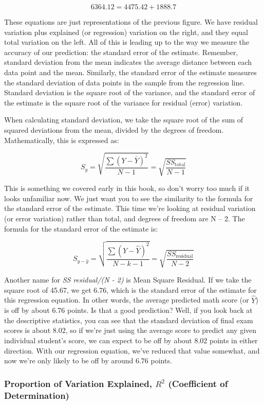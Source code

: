 \documentclass[
  letterpaper,
  DIV=11,
  numbers=noendperiod]{scrreprt}
\begin{document}
\[
6364.12 = 4475.42 + 1888.7
\]

These equations are just representations of the previous figure. We have
residual variation plus explained (or regression) variation on the
right, and they equal total variation on the left. All of this is
leading up to the way we measure the accuracy of our prediction: the
standard error of the estimate. Remember, standard deviation from the
mean indicates the average distance between each data point and the
mean. Similarly, the standard error of the estimate measures the
standard deviation of data points in the sample from the regression
line. Standard deviation is the square root of the variance, and the
standard error of the estimate is the square root of the variance for
residual (error) variation.

When calculating standard deviation, we take the square root of the sum
of squared deviations from the mean, divided by the degrees of freedom.
Mathematically, this is expressed as:

\[
S_y = \sqrt{\frac{\sum (Y - \bar{Y})^2}{N - 1}} = \sqrt{\frac{SS_{\text{total}}}{N - 1}}
\]

This is something we covered early in this book, so don't worry too much
if it looks unfamiliar now. We just want you to see the similarity to
the formula for the standard error of the estimate. This time we're
looking at residual variation (or error variation) rather than total,
and degrees of freedom are N -- 2. The formula for the standard error of
the estimate is:

\[
S_{y - \hat{y}} = \sqrt{\frac{\sum (Y - \hat{Y})^2}{N - k - 1}} = \sqrt{\frac{SS_{\text{residual}}}{N - 2}}
\]

Another name for \emph{SS residual/(N - 2)} is Mean Square Residual. If
we take the square root of 45.67, we get 6.76, which is the standard
error of the estimate for this regression equation. In other words, the
average predicted math score (or \(\hat{Y}\)) is off by about 6.76
points. Is that a good prediction? Well, if you look back at the
descriptive statistics, you can see that the standard deviation of final
exam scores is about 8.02, so if we're just using the average score to
predict any given individual student's score, we can expect to be off by
about 8.02 points in either direction. With our regression equation,
we've reduced that value somewhat, and now we're only likely to be off
by around 6.76 points.

\subsubsection*{\texorpdfstring{Proportion of Variation Explained,
\(R^2\) (Coefficient of
Determination)}{Proportion of Variation Explained, R\^{}2 (Coefficient of Determination)}}\label{proportion-of-variation-explained-r2-coefficient-of-determination}
\end{document}
